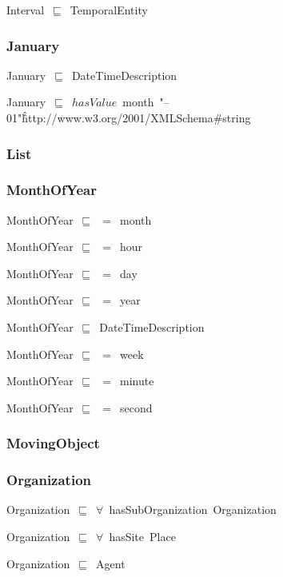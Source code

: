 \documentclass{article}
\begin{document}
Interval~\ensuremath{\sqsubseteq}~TemporalEntity~

\subsubsection*{January}

January~\ensuremath{\sqsubseteq}~DateTimeDescription~

January~\ensuremath{\sqsubseteq}~\ensuremath{hasValue}~month~"--01"\^\^http://www.w3.org/2001/XMLSchema#string~

\subsubsection*{List}

\subsubsection*{MonthOfYear}

MonthOfYear~\ensuremath{\sqsubseteq}~\ensuremath{=}~month~

MonthOfYear~\ensuremath{\sqsubseteq}~\ensuremath{=}~hour~

MonthOfYear~\ensuremath{\sqsubseteq}~\ensuremath{=}~day~

MonthOfYear~\ensuremath{\sqsubseteq}~\ensuremath{=}~year~

MonthOfYear~\ensuremath{\sqsubseteq}~DateTimeDescription~

MonthOfYear~\ensuremath{\sqsubseteq}~\ensuremath{=}~week~

MonthOfYear~\ensuremath{\sqsubseteq}~\ensuremath{=}~minute~

MonthOfYear~\ensuremath{\sqsubseteq}~\ensuremath{=}~second~

\subsubsection*{MovingObject}

\subsubsection*{Organization}

Organization~\ensuremath{\sqsubseteq}~\ensuremath{\forall}~hasSubOrganization~Organization~

Organization~\ensuremath{\sqsubseteq}~\ensuremath{\forall}~hasSite~Place~

Organization~\ensuremath{\sqsubseteq}~Agent~
\end{document}
